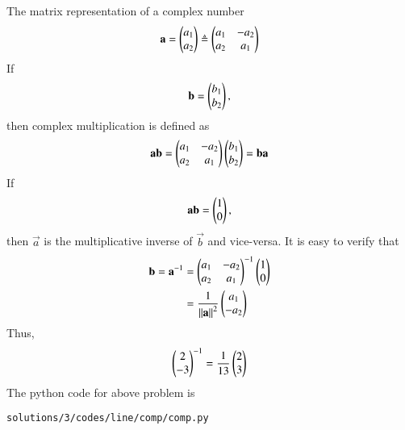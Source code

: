 The matrix representation of a complex number 
\begin{align}
\mathbf{a} = \begin{pmatrix}a_1\\a_2\end{pmatrix} \triangleq \begin{pmatrix}a_1 & -a_2\\ a_2 & a_1\end{pmatrix}
\end{align}
If 
\begin{align}
\mathbf{b}=\begin{pmatrix}b_1\\b_2\end{pmatrix},
\end{align}
then complex multiplication  is defined as
\begin{align}
\mathbf{a}\mathbf{b} = \begin{pmatrix}a_1 & -a_2\\ a_2 & a_1\end{pmatrix}\begin{pmatrix}b_1\\b_2\end{pmatrix} = \mathbf{b}\mathbf{a}
\end{align}
If 
\begin{align}
\mathbf{a}\mathbf{b} = \begin{pmatrix}1\\0\end{pmatrix}, 
\end{align}
then $\vec{a}$ is the multiplicative inverse of  $\vec{b}$ and vice-versa.   It is easy to verify that
\begin{align}
\mathbf{b}=\mathbf{a}^{-1} &= \begin{pmatrix}a_1&-a_2\\a_2&a_1\end{pmatrix}^{-1}\begin{pmatrix}1\\0\end{pmatrix}\\
&=\frac{1}{\left\lVert\mathbf{a}\right\rVert^2}\begin{pmatrix}a_1\\-a_2\end{pmatrix}
\label{eq:3.4.3_comp_inv}
\end{align}
Thus, 
\begin{align}
\begin{pmatrix}2\\-3\end{pmatrix}^{-1}= \frac{1}{13}\begin{pmatrix}2\\3\end{pmatrix}
\end{align}
The python code for above problem is
\begin{lstlisting}
solutions/3/codes/line/comp/comp.py
\end{lstlisting}
